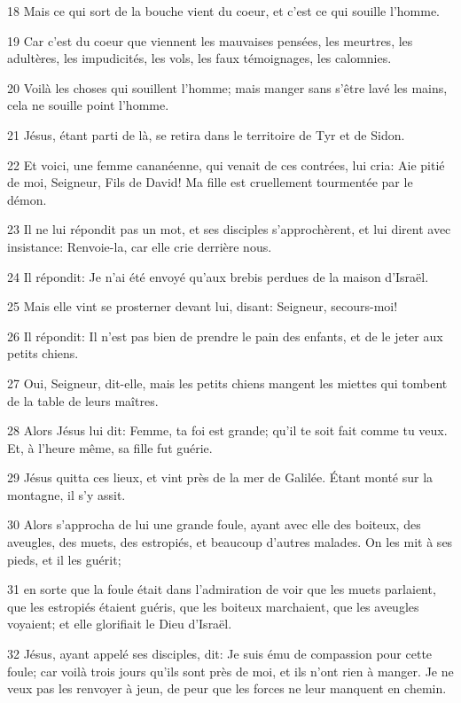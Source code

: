 \par 18 Mais ce qui sort de la bouche vient du coeur, et c'est ce qui souille l'homme.
\par 19 Car c'est du coeur que viennent les mauvaises pensées, les meurtres, les adultères, les impudicités, les vols, les faux témoignages, les calomnies.
\par 20 Voilà les choses qui souillent l'homme; mais manger sans s'être lavé les mains, cela ne souille point l'homme.
\par 21 Jésus, étant parti de là, se retira dans le territoire de Tyr et de Sidon.
\par 22 Et voici, une femme cananéenne, qui venait de ces contrées, lui cria: Aie pitié de moi, Seigneur, Fils de David! Ma fille est cruellement tourmentée par le démon.
\par 23 Il ne lui répondit pas un mot, et ses disciples s'approchèrent, et lui dirent avec insistance: Renvoie-la, car elle crie derrière nous.
\par 24 Il répondit: Je n'ai été envoyé qu'aux brebis perdues de la maison d'Israël.
\par 25 Mais elle vint se prosterner devant lui, disant: Seigneur, secours-moi!
\par 26 Il répondit: Il n'est pas bien de prendre le pain des enfants, et de le jeter aux petits chiens.
\par 27 Oui, Seigneur, dit-elle, mais les petits chiens mangent les miettes qui tombent de la table de leurs maîtres.
\par 28 Alors Jésus lui dit: Femme, ta foi est grande; qu'il te soit fait comme tu veux. Et, à l'heure même, sa fille fut guérie.
\par 29 Jésus quitta ces lieux, et vint près de la mer de Galilée. Étant monté sur la montagne, il s'y assit.
\par 30 Alors s'approcha de lui une grande foule, ayant avec elle des boiteux, des aveugles, des muets, des estropiés, et beaucoup d'autres malades. On les mit à ses pieds, et il les guérit;
\par 31 en sorte que la foule était dans l'admiration de voir que les muets parlaient, que les estropiés étaient guéris, que les boiteux marchaient, que les aveugles voyaient; et elle glorifiait le Dieu d'Israël.
\par 32 Jésus, ayant appelé ses disciples, dit: Je suis ému de compassion pour cette foule; car voilà trois jours qu'ils sont près de moi, et ils n'ont rien à manger. Je ne veux pas les renvoyer à jeun, de peur que les forces ne leur manquent en chemin.
